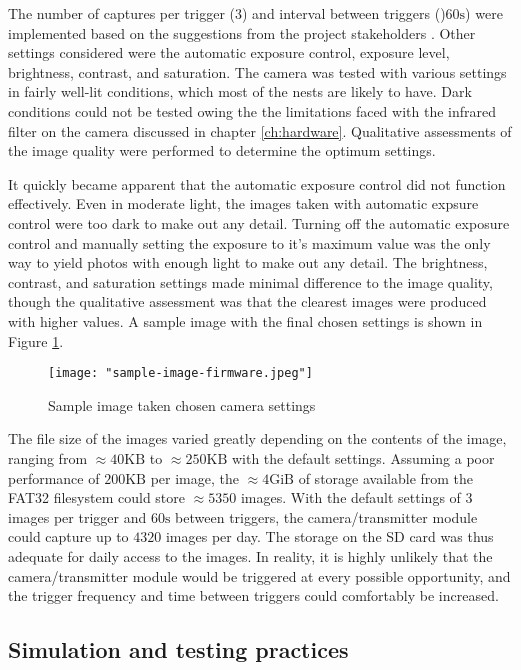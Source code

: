 \documentclass[class=report,11pt,crop=false]{standalone}
\begin{document}
The number of captures per trigger ($\mathrm{3}$) and interval between triggers ()$60 \mathrm{s}$) were implemented based on the suggestions from the project stakeholders \cite{hofmeyer2024private}. Other settings considered were the automatic exposure control, exposure level, brightness, contrast, and saturation. The camera was tested with various settings in fairly well-lit conditions, which most of the nests are likely to have. Dark conditions could not be tested owing the the limitations faced with the infrared filter on the camera discussed in chapter \ref{ch:hardware}. Qualitative assessments of the image quality were performed to determine the optimum settings.

It quickly became apparent that the automatic exposure control did not function effectively. Even in moderate light, the images taken with automatic expsure control were too dark to make out any detail. Turning off the automatic exposure control and manually setting the exposure to it's maximum value was the only way to yield photos with enough light to make out any detail. The brightness, contrast, and saturation settings made minimal difference to the image quality, though the qualitative assessment was that the clearest images were produced with higher values. A sample image with the final chosen settings is shown in Figure \ref{fig:sample-image-firmware}.

\begin{figure}[ht]
    \centering
    \texttt{[image: "sample-image-firmware.jpeg"]}
    \caption{Sample image taken chosen camera settings}
    \label{fig:sample-image-firmware}
\end{figure}

The file size of the images varied greatly depending on the contents of the image, ranging from $\approx 40 \mathrm{KB}$ to $\approx 250 \mathrm{KB}$ with the default settings. Assuming a poor performance of $200 \mathrm{KB}$ per image, the $\approx 4 \mathrm{GiB}$ of storage available from the FAT32 filesystem could store $\approx 5350$ images. With the default settings of $3$ images per trigger and $60\mathrm{s}$ between triggers, the camera/transmitter module could capture up to $4320$ images per day. The storage on the SD card was thus adequate for daily access to the images. In reality, it is highly unlikely that the camera/transmitter module would be triggered at every possible opportunity, and the trigger frequency and time between triggers could comfortably be increased.

\subsection{Simulation and testing practices}
\end{document}
